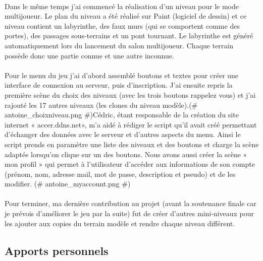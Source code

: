 \documentclass[titlepage, 13px, a4paper]{report}
\begin{document}
\paragraph{} \hspace{0pt} 
Dans le même temps j'ai commencé la réalisation d'un niveau pour le mode
multijoueur. Le plan du niveau a été réalisé sur Paint (logiciel de dessin) et ce
niveau contient un labyrinthe, des faux murs (qui se comportent comme des
portes), des passages sous-terrains et un pont tournant. Le labyrinthe est généré
automatiquement lors du lancement du salon multijoueur. Chaque terrain possède
donc une partie connue et une autre inconnue. \\


\paragraph{} \hspace{0pt} 
Pour le menu du jeu j'ai d'abord assemblé boutons et textes pour créer une
interface de connexion au serveur, puis d'inscription. J'ai ensuite repris la première
scène du choix des niveaux (avec les trois boutons rappelez vous) et j'ai rajouté
les 17 autres niveaux (les clones du niveau modèle).\@(\# antoine\_choixniveau.png \#)\@ Cédric, étant responsable de
la création du site internet « accer.ddns.net», m'a aidé à rédiger le script qu'il avait créé permettant 
d'échanger des données avec le serveur et d'autres aspects du menu. Ainsi le script prends
en paramètre une liste des niveaux et des boutons et charge la scène adaptée
lorsqu'on clique sur un des boutons. Nous avons aussi créer la scène « mon
profil » qui permet à l'utilisateur d'accéder aux informations de son compte
(prénom, nom, adresse mail, mot de passe, description et pseudo) et de les
modifier. \@(\# antoine\_myaccount.png \#)\@ \\


\paragraph{} \hspace{0pt} 
Pour terminer, ma dernière contribution au projet (avant la soutenance finale car je
prévois d'améliorer le jeu par la suite) fut de créer d'autres mini-niveaux pour les
ajouter aux copies du terrain modèle et rendre chaque niveau différent. \\


\subsection{Apports personnels}
\end{document}
